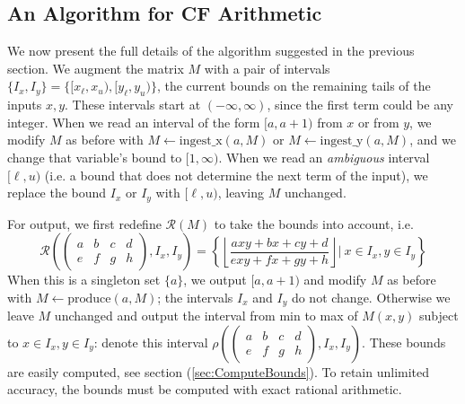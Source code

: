\documentclass[11pt, oneside]{amsart}   	%
\newcommand{\bihom}[8]{{\frac{#1 xy + #2 x + #3 y + #4}{#5 xy + #6 x + #7 y + #8}}}
\newcommand{\abcd}{\left(
\begin{smallmatrix} 
a & b & c & d\\ 
e & f & g & h
\end{smallmatrix}
\right)}
\begin{document}
\subsection{An Algorithm for CF Arithmetic}\label{sec:finalAlgorithm}
We now present the full details of the algorithm suggested in the previous section.  We augment the matrix $M$ with a pair of intervals
$\{I_x, I_y\} = \{[x_{\ell},x_{u}), [y_{\ell}, y_{u})\}$, the current bounds on the remaining tails of the inputs $x,y$. These
intervals start at $(-\infty, \infty)$, since the first term could be any integer. When we read an interval of the form $[a,a+1)$ from
$x$ or from $y$, we modify $M$ as before with $M \leftarrow \mbox{ingest\_x}(a,M)$ or $M \leftarrow \mbox{ingest\_y}(a,M)$,
and we change that variable's bound to $[1, \infty)$. When we read an \emph{ambiguous} interval $[\ell, u)$ (i.e. a bound that
does not determine the next term of the input), we replace the bound $I_x$ or $I_y$  with $[\ell, u)$, leaving $M$ unchanged.

For output, we first redefine $\mathcal{R}(M)$ to take the bounds into account, i.e.
\[
\mathcal{R}\left(\abcd, I_x, I_y\right) = \left\{ \left\lfloor \bihom{a}{b}{c}{d}{e}{f}{g}{h} \right\rfloor | \  x \in I_x, y \in I_y \right\}
\]
When this is a singleton set $\{a\}$, we output $[a,a+1)$ and modify $M$ as before with $M \leftarrow \mbox{produce}(a,M)$;
the intervals $I_x$ and $I_y$ do not change. Otherwise we leave $M$ unchanged and output the interval from min to max of $M(x,y)$ subject to $x \in I_x, y \in I_y$:
denote this interval $\rho\left(\abcd, I_x, I_y\right)$.
These bounds are easily computed, see section (\ref{sec:ComputeBounds}).
To retain unlimited accuracy, the bounds must be computed with exact rational arithmetic.
\end{document}
